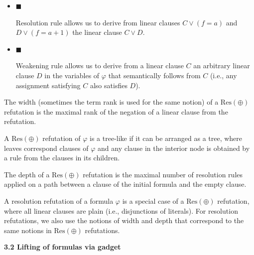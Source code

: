 \begin{itemize}


\item 
$\blacksquare$ 


Resolution rule allows us to derive from linear clauses $C\lor(f=a)$ and $D\lor(f=a+1)$ the linear clause $C\lor D$.\par





\item 
$\blacksquare$ 


Weakening rule allows us to derive from a linear clause $C$ an arbitrary linear clause $D$ in the variables of $\varphi$ that semantically follows from $C$ (i.e., any assignment satisfying $C$ also satisfies $D$).\par





\end{itemize}



The width (sometimes the term rank is used for the same notion) of a $\mathrm{Res}(\oplus)$ refutation is the maximal rank of the negation of a linear clause from the refutation.\par



A $\mathrm{Res}(\oplus)$ refutation of $\varphi$ is a tree-like if it can be arranged as a tree, where leaves correspond clauses of $\varphi$ and any clause in the interior node is obtained by a rule from the clauses in its children.\par



The depth of a $\mathrm{Res}(\oplus)$ refutation is the
maximal number of resolution rules applied on a path between a clause of the initial formula and the empty clause.\par



A resolution refutation of a formula $\varphi$ is a special case of a $\mathrm{Res}(\oplus)$ refutation, where all linear clauses are plain (i.e., disjunctions of literals). For resolution refutations, we also use the notions of width and depth that correspond to the same notions in $\mathrm{Res}(\oplus)$ refutations.\par


\par\medskip\noindent\textbf{
3.2 Lifting of formulas via gadget}\par


